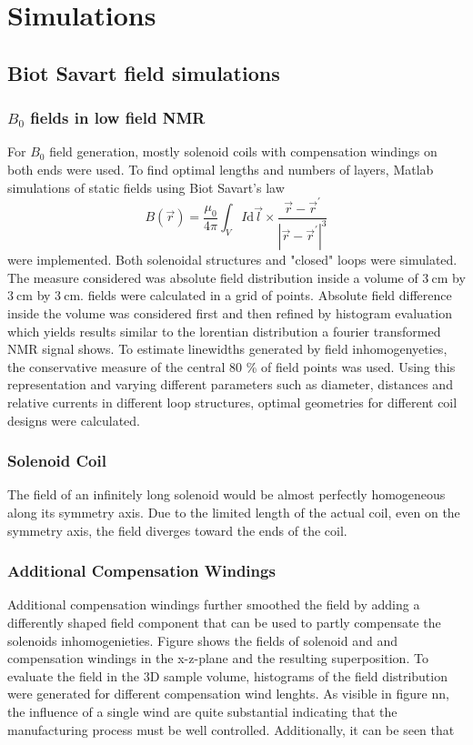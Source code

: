 \chapter{Simulations}\label{chapter:simulations}
\section{Biot Savart field simulations}
\subsection{$B_0$ fields in low field NMR}\label{simulations:B0}
        For $B_0$ field generation, mostly solenoid coils with compensation windings on both ends were used. To find optimal lengths and numbers of layers, Matlab simulations of static fields using Biot Savart's law 
        \begin{equation}
            B(\vec r) = \frac{\mu_0}{4\pi}\int_VI\mathrm d \vec l \times \frac{\vec r - \vec r^'}{\left|\vec r - \vec r^'\right|^3}
        \end{equation}
        were implemented.  Both solenoidal structures and "closed" loops were simulated. The measure considered was absolute field distribution inside a volume of $\SI{3}{\centi\meter}$ by  $\SI{3}{\centi\meter}$ by $\SI{3}{\centi\meter}$. 
        fields were calculated in a grid of  points. Absolute field difference inside the volume was considered first and then refined by histogram evaluation which yields results similar to the lorentian distribution a fourier transformed NMR signal shows. To estimate linewidths generated by field inhomogenyeties, the conservative measure of the central 80 \% of field points was used.
        Using this representation and varying different parameters such as diameter, distances and relative currents in different loop structures, optimal geometries for different coil designs were calculated.
        \subsection{Solenoid Coil}
            The field of an infinitely long solenoid would be almost perfectly homogeneous along its symmetry axis. Due to the limited length of the actual coil, even on the symmetry axis, the field diverges toward the ends of the coil.
        \subsection{Additional Compensation Windings}
            Additional compensation windings further smoothed the field by adding a differently shaped field component that can be used to partly compensate the solenoids inhomogenieties. Figure  shows the fields of solenoid and and compensation windings in the x-z-plane and the resulting superposition.
            To evaluate the field in the 3D sample volume, histograms of the field distribution were generated for different compensation wind lenghts. As visible in figure nn, the influence of a single wind are quite substantial indicating that the manufacturing process must be well controlled. Additionally, it can be seen that

